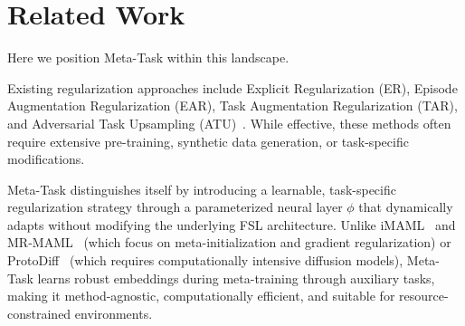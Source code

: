 
\section{Related Work}\label{sec:back_ground}

Here we position Meta-Task within this landscape.

Existing regularization approaches include Explicit Regularization (ER), Episode Augmentation Regularization (EAR), Task Augmentation Regularization (TAR), and Adversarial Task Upsampling (ATU)~\cite{imaml,mrmaml,yamaguchi2023regularizing,yao2021meta,wu2022adversarial}. While effective, these methods often require extensive pre-training, synthetic data generation, or task-specific modifications.

Meta-Task distinguishes itself by introducing a learnable, task-specific regularization strategy through a parameterized neural layer $\phi$ that dynamically adapts without modifying the underlying FSL architecture. Unlike iMAML~\cite{imaml} and MR-MAML~\cite{mrmaml} (which focus on meta-initialization and gradient regularization) or ProtoDiff~\cite{du2023protodiff} (which requires computationally intensive diffusion models), Meta-Task learns robust embeddings during meta-training through auxiliary tasks, making it method-agnostic, computationally efficient, and suitable for resource-constrained environments.



